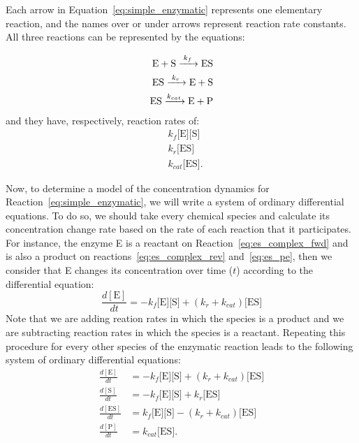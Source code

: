 Each arrow in Equation~\ref{eq:simple_enzymatic} represents one 
elementary reaction, and the names over or under arrows represent 
reaction rate constants. All three reactions can be represented by the
equations:

\begin{subequations}
\begin{align}
\ce{
    E + S ->[\ce{$k_f$}] ES 
} \label{eq:es_complex_fwd} \\
\ce{
    ES ->[$k_r$] E + S
} \label{eq:es_complex_rev} \\
\ce{
    ES ->[$k_{cat}$] E + P
} \label{eq:es_pe} 
\end{align}
\end{subequations}
and they have, respectively, reaction rates of:
\begin{equation*}
\begin{aligned}
    & k_f\text{[E][S]} \\
    & k_r\text{[ES]} \\
    & k_{cat}\text{[ES]}.
\end{aligned}
\end{equation*}

Now, to determine a model of the concentration dynamics for
Reaction~\ref{eq:simple_enzymatic}, we will write a system of ordinary
differential equations. To do so, we should take every chemical species 
and calculate its concentration change rate based on the rate of each 
reaction that it participates. For instance, the enzyme E is a 
reactant on Reaction~\ref{eq:es_complex_fwd} and is also a product on 
reactions~\ref{eq:es_complex_rev} and~\ref{eq:es_pe}, then we consider 
that E changes its concentration over time ($t$) according to the 
differential equation:
\begin{equation}
    \frac{d[\text{E}]}{dt} = -k_f\text{[E][S]} + (k_r + k_{cat}) \text{[ES]}
\end{equation} 
Note that we are adding reation rates in which the species is a product
and we are subtracting reaction rates in which the species is a
reactant. Repeating this procedure for every other species of the 
enzymatic reaction leads to the following system of ordinary 
differential equations:
\begin{subequations}
    \label{eq:full_system}
    \begin{align}
        \frac{d[\text{E}]}{dt} & =  
            -k_f\text{[E][S]} + (k_r + k_{cat}) \text{[ES]} 
            \label{eq:dEdt} \\
        \frac{d[\text{S}]}{dt}  & = 
            -k_f\text{[E][S]} + k_r\text{[ES]} 
            \label{eq:dSdt} \\
        \frac{d[\text{ES}]}{dt} & =  
            k_f\text{[E][S]} - (k_r + k_{cat}) \text{[ES]} 
            \label{eq:dESdt} \\
        \frac{d[\text{P}]}{dt} & = k_{cat}\text{[ES]} \label{eq:dPdt}.
    \end{align}
\end{subequations}

